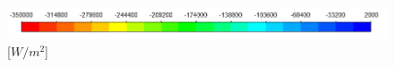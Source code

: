 \documentclass[review]{elsarticle}
\begin{document}
\begin{figure}[h!]
\centering
\includegraphics[scale = 0.45]{HEATFLUX_KEY} [$W/m^2$]\\
\hspace{5mm}

\end{figure}
\end{document}
